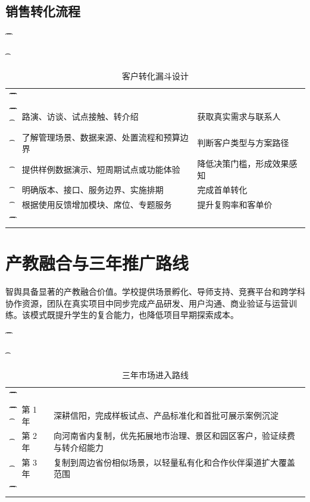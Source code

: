 \subsection{销售转化流程}

\begin{table}[htbp]
	\t\centering
	\t\caption{客户转化漏斗设计}
	\t\begin{tabularx}{\textwidth}{|L{2.8cm}YY|}
		\t\t\toprule
		\t\t{} &         &  \\
		\t\t\midrule
		\t\t{}
		\t{}         & 路演、访谈、试点接触、转介绍        & 获取真实需求与联系人     \\
		\t{}         & 了解管理场景、数据来源、处置流程和预算边界 & 判断客户类型与方案路径    \\
		\t{}         & 提供样例数据演示、短周期试点或功能体验   & 降低决策门槛，形成效果感知  \\
		\t{}         & 明确版本、接口、服务边界、实施排期     & 完成首单转化         \\
		\t{}         & 根据使用反馈增加模块、席位、专题服务    & 提升复购率和客单价      \\
		\t\t\bottomrule
		\t\end{tabularx}
\end{table}

\section{产教融合与三年推广路线}

智舆具备显著的产教融合价值。学校提供场景孵化、导师支持、竞赛平台和跨学科协作资源，团队在真实项目中同步完成产品研发、用户沟通、商业验证与运营训练。该模式既提升学生的复合能力，也降低项目早期探索成本。

\begin{table}[htbp]
	\t\centering
	\t\caption{三年市场进入路线}
	\t\begin{tabularx}{\textwidth}{|L{2cm}L{2cm}Y|}
		\t\t\toprule
		\t\t{} &  &                       \\
		\t\t\midrule
		\t\t{}
		\t{}          & 第 1 年        & 深耕信阳，完成样板试点、产品标准化和首批可展示案例沉淀         \\
		\t{}          & 第 2 年        & 向河南省内复制，优先拓展地市治理、景区和园区客户，验证续费与转介绍能力 \\
		\t{}          & 第 3 年        & 复制到周边省份相似场景，以轻量私有化和合作伙伴渠道扩大覆盖范围     \\
		\t\t\bottomrule
		\t\end{tabularx}
\end{table}
